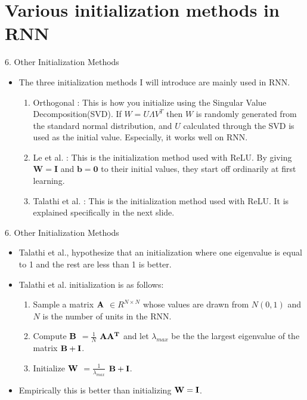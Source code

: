 \documentclass{beamer}
\begin{document}
	\section{Various initialization methods in RNN}
	\begin{frame}{6. Other Initialization Methods}
		\begin{itemize}
			\item The three initialization methods I will introduce are mainly used in RNN.
			\vspace{8pt}
			\begin{enumerate}
				\item Orthogonal\cite{orthogonal} : This is how you initialize using the Singular Value Decomposition(SVD). If $W=U\Lambda V^T$ then $W$ is randomly generated from the standard normal distribution, 
				and $U$ calculated through the SVD is used as the initial value. Especially, it works well on RNN.
				\vspace{8pt}
				\item Le et al.\cite{rnnrelu} : This is the initialization method used with ReLU. By giving $\boldsymbol{W=I}$ and $\boldsymbol{b=0}$ to their initial values, they start off ordinarily at first learning.
				\vspace{8pt}
				\item Talathi et al.\cite{rnnrelu2} : This is the initialization method used with ReLU. It is explained specifically in the next slide.
			\end{enumerate}
		\end{itemize}
	\end{frame}	


	\begin{frame}{6. Other Initialization Methods}
		\begin{itemize}
			\item Talathi et al., hypothesize that an initialization where one eigenvalue is equal to 1 and the rest are less than 1 is better. 
			\item Talathi et al. initialization is as follows:
			\vspace{7pt}
			\begin{enumerate}
				\item Sample a matrix $\bf{A}$ $\in R^{N \times N}$ whose values are drawn from $N(0,1)$ and $N$ is the number of units in the RNN.
				\vspace{5pt}
				\item Compute $\bf{B}$ $=\frac{1}{N}$ $\bf{A}{A^T}$ and let $\lambda_{max}$ be the the largest eigenvalue of the matrix $\bf{B+I}$.
				\vspace{5pt}
				\item Initialize $\bf{W}$ $= \frac{1}{\lambda_{max}}$ $\bf{B + I}$.
			\end{enumerate}
			\vspace{7pt}
			\item Empirically this is better than initializing $\bf{W=I}$.
		\end{itemize}
	\end{frame}	
\end{document}
